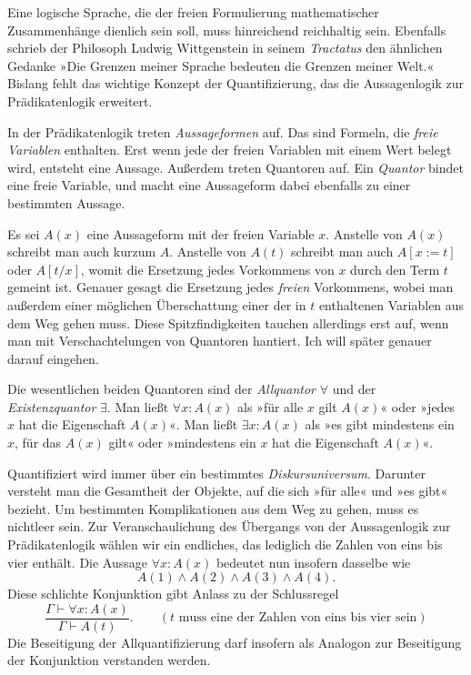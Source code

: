 Eine logische Sprache, die der freien Formulierung mathematischer
Zusammenhänge dienlich sein soll, muss hinreichend reichhaltig sein.
Ebenfalls schrieb der Philosoph Ludwig Wittgenstein in seinem
\emph{Tractatus} den ähnlichen Gedanke »Die Grenzen meiner Sprache
bedeuten die Grenzen meiner Welt.« Bislang fehlt das wichtige Konzept
der Quantifizierung, das die Aussagenlogik zur Prädikatenlogik
erweitert.

In der Prädikatenlogik treten \emph{Aussageformen}
auf. Das sind Formeln, die \emph{freie Variablen}
enthalten. Erst wenn jede der freien Variablen mit einem Wert belegt
wird, entsteht eine Aussage. Außerdem treten Quantoren auf. Ein
\emph{Quantor} bindet eine freie Variable, und macht
eine Aussageform dabei ebenfalls zu einer bestimmten Aussage.

Es sei $A(x)$ eine Aussageform mit der freien Variable $x$. Anstelle
von $A(x)$ schreibt man auch kurzum $A$. Anstelle von $A(t)$ schreibt
man auch $A[x:=t]$ oder $A[t/x]$, womit die Ersetzung jedes Vorkommens
von $x$ durch den Term $t$ gemeint ist. Genauer gesagt die Ersetzung
jedes \emph{freien} Vorkommens, wobei man außerdem einer möglichen
Überschattung einer der in $t$ enthaltenen Variablen aus dem Weg gehen
muss. Diese Spitzfindigkeiten tauchen allerdings erst auf, wenn man mit
Verschachtelungen von Quantoren hantiert. Ich will später
genauer darauf eingehen.

Die wesentlichen beiden Quantoren sind der \emph{Allquantor}%
 $\forall$ und der
\emph{Existenzquantor} $\exists$. Man ließt
$\forall x\colon A(x)$ als »für alle $x$ gilt $A(x)$« oder »jedes $x$
hat die Eigenschaft $A(x)$«. Man ließt $\exists x\colon A(x)$ als »es
gibt mindestens ein $x$, für das $A(x)$ gilt« oder »mindestens ein $x$
hat die Eigenschaft $A(x)$«.

Quantifiziert wird immer über ein bestimmtes \emph{Diskursuniversum}.
Darunter versteht man die Gesamtheit der Objekte, auf die sich
»für alle« und »es gibt« bezieht. Um bestimmten Komplikationen aus dem
Weg zu gehen, muss es nichtleer sein. Zur Veranschaulichung des
Übergangs von der Aussagenlogik zur Prädikatenlogik wählen wir ein
endliches, das lediglich die Zahlen von eins bis vier enthält.
Die Aussage $\forall x\colon A(x)$ bedeutet nun insofern dasselbe wie
\[A(1)\land A(2)\land A(3)\land A(4).\]
Diese schlichte Konjunktion gibt Anlass zu der Schlussregel
\[\dfrac{\Gamma\vdash\forall x\colon A(x)}{\Gamma\vdash A(t)}.
\qquad(\text{$t$ muss eine der Zahlen von eins bis vier sein})\]
Die Beseitigung der Allquantifizierung darf insofern als Analogon zur
Beseitigung der Konjunktion verstanden werden.

